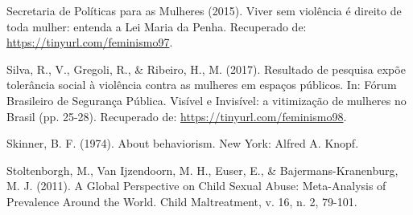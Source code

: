 \hangindent=25pt
\noindent Secretaria de Políticas para as Mulheres (2015). Viver sem violência é direito de toda mulher: entenda a Lei Maria da Penha. Recuperado de: \url{https://tinyurl.com/feminismo97}.

\hangindent=25pt
\noindent Silva, R., V., Gregoli, R., \& Ribeiro, H., M. (2017). Resultado de pesquisa expõe tolerância social à violência contra as mulheres em espaços públicos. In: Fórum Brasileiro de Segurança Pública. Visível e Invisível: a vitimização de mulheres no Brasil (pp. 25-28). Recuperado de: \url{https://tinyurl.com/feminismo98}.

\hangindent=25pt
\noindent Skinner, B. F. (1974). About behaviorism. New York: Alfred A. Knopf.

\hangindent=25pt
\noindent Stoltenborgh, M., Van Ijzendoorn, M. H., Euser, E., \& Bajermans-Kranenburg, M. J. (2011). A Global Perspective on Child Sexual Abuse: Meta-Analysis of Prevalence Around the World. Child Maltreatment, v. 16, n. 2, 79-101.
